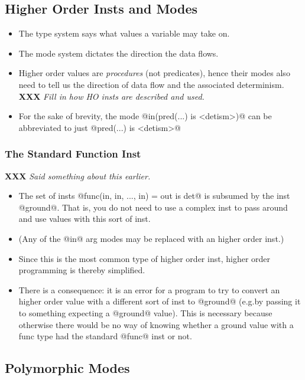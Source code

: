 \documentclass[a4paper,11pt,notitlepage,onecolumn]{article}
\makeatletter
\newcommand{\eg}%
{e.g.\@ }
\newcommand{\XXX}[1]%
{{\small\textbf{XXX} \emph{#1}}}
\makeatother
\begin{document}
\subsection{Higher Order Insts and Modes}

\begin{itemize}
\item The type system says what values a variable may take on.
\item The mode system dictates the direction the data flows.
\item Higher order values are \emph{procedures} (not predicates), hence
  their modes also need to tell us the direction of data flow
  and the associated determinism.  \XXX{Fill in how HO insts are
  described and used.}
\item For the sake of brevity, the mode @in(pred(...) is <detism>)@
  can be abbreviated to just @pred(...) is <detism>@
\end{itemize}

\subsubsection{The Standard Function Inst}

\XXX{Said something about this earlier.}

\begin{itemize}
\item The set of insts @func(in, in, ..., in) = out is det@ is
  subsumed by the inst @ground@.  That is, you do not need to
  use a complex inst to pass around and use values with this
  sort of inst.
\item (Any of the @in@ arg modes may be replaced with an higher
  order inst.)
\item Since this is the most common type of higher order inst,
  higher order programming is thereby simplified.
\item There is a consequence: it is an error for a program to try
  to convert an higher order value with a different sort of
  inst to @ground@ (\eg by passing it to something expecting a
  @ground@ value).  This is necessary because otherwise there
  would be no way of knowing whether a ground value with a
  func type had the standard @func@ inst or not.
\end{itemize}

\subsection{Polymorphic Modes}
\end{document}
